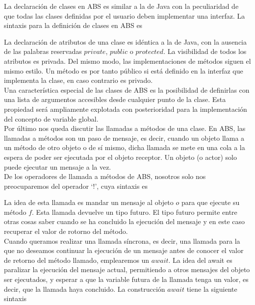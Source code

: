 La declaración de clases en ABS es similar a la de Java con la peculiaridad de que todas las clases definidas por el usuario deben implementar una interfaz. La sintaxis para la definición de clases en ABS es



La declaración de atributos de una clase es idéntica a la de Java, con la ausencia de las palabras reservadas $private$, $public$ o $protected$. La visibilidad de todos los atributos es privada. Del mismo modo, las implementaciones de métodos siguen el mismo estilo. Un método es por tanto público si está definido en la interfaz que implementa la clase, en caso contrario es privado.\\

Una característica especial de las clases de ABS es la posibilidad de definirlas con una lista de argumentos accesibles desde cualquier punto de la clase. Esta propiedad será ampliamente explotada con posterioridad para la implementación del concepto de variable global.\\

Por último nos queda discutir las llamadas a métodos de una clase. En ABS, las llamadas a métodos son un paso de mensaje, es decir, cuando un objeto llama a un método de otro objeto o de sí mismo, dicha llamada se mete en una cola a la espera de poder ser ejecutada por el objeto receptor. Un objeto (o actor) solo puede ejecutar un mensaje a la vez.\\

De los operadores de llamada a métodos de ABS, nosotros solo nos preocuparemos del operador `$!$', cuya sintaxis es



La idea de esta llamada es mandar un mensaje al objeto $o$ para que ejecute su método $f$. Esta llamada devuelve un tipo futuro. El tipo futuro permite entre otras cosas saber cuando se ha concluido la ejecución del mensaje y en este caso recuperar el valor de rotorno del método.\\

Cuando queramos realizar una llamada síncrona, es decir, una llamada para la que no deseamos continuar la ejecución de un mensaje antes de conocer el valor de retorno del método llamado, emplearemos un $await$. La idea del await es paralizar la ejecución del mensaje actual, permitiendo a otros mensajes del objeto ser ejecutados, y esperar a que la variable futura de la llamada tenga un valor, es decir, que la llamada haya concluido. La construcción $await$ tiene la siguiente sintaxis

